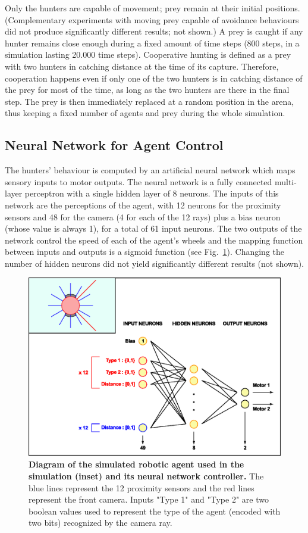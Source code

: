     Only the hunters are capable of movement; prey remain at their initial positions. (Complementary experiments with moving prey capable of avoidance behaviours did not produce significantly different results; not shown.) A prey is caught if any hunter remains close enough during a fixed amount of time steps (800 steps, in a simulation lasting 20.000 time steps). Cooperative hunting is defined as a prey with two hunters in catching distance at the time of its capture. Therefore, cooperation happens even if only one of the two hunters is in catching distance of the prey for most of the time, as long as the two hunters are there in the final step. The prey is then immediately replaced at a random position in the arena, thus keeping a fixed number of agents and prey during the whole simulation.


  \subsection{Neural Network for Agent Control}
  \label{nn}
    The hunters' behaviour is computed by an artificial neural network which maps sensory inputs to motor outputs. The neural network is a fully connected multi-layer perceptron with a single hidden layer of 8 neurons. The inputs of this network are the perceptions of the agent, with 12 neurons for the proximity sensors and 48 for the camera (4 for each of the 12 rays) plus a bias neuron (whose value is always 1), for a total of 61 input neurons. The two outputs of the network control the speed of each of the agent's wheels and the mapping function between inputs and outputs is a sigmoid function (see Fig.~\ref{fig:robotDescription}). Changing the number of hidden neurons did not yield significantly different results (not shown).

    \begin{figure}[h]
      \centering
        \includegraphics[scale = 0.75]{fig/ArticleBio1/Fig2.eps}
        \caption{\textbf{Diagram of the simulated robotic agent used in the simulation (inset) and its neural network controller.}
        The blue lines represent the 12 proximity sensors and the red lines represent the front camera. Inputs "Type 1" and "Type 2" are two boolean values used to represent the type of the agent (encoded with two bits) recognized by the camera ray.}
      \label{fig:robotDescription}
    \end{figure}


